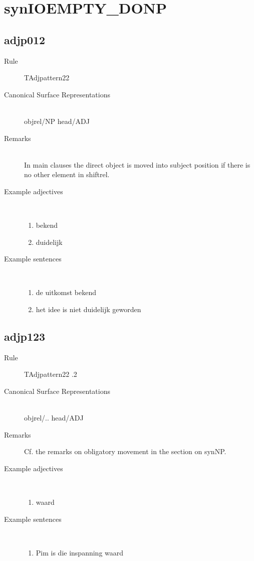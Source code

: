 \section{synIOEMPTY\_DONP}
  \subsection{adjp012}
\begin{description}
  \item [Rule] TAdjpattern22
  \item [Canonical Surface Representations]  \mbox{}\\ objrel/NP head/ADJ
  \item [Remarks] \mbox{}\\
 In main clauses the direct object is moved into subject position if 
there is no other element in shiftrel. 
  \item [Example adjectives]\mbox{}\\
\begin{enumerate}
  \item bekend
  \item duidelijk
\end{enumerate}
  \item [Example sentences]\mbox{}\\
\begin{enumerate}
  \item de uitkomst bekend
  \item het idee  is niet duidelijk geworden
\end{enumerate}
\end{description}
  \subsection{adjp123}
\begin{description}
  \item [Rule] TAdjpattern22 .2
  \item [Canonical Surface Representations]  \mbox{}\\ objrel/.. head/ADJ
  \item [Remarks]
Cf. the remarks on obligatory movement in the section on synNP.
  \item [Example adjectives]\mbox{}\\
\begin{enumerate}
  \item waard
\end{enumerate}
  \item [Example sentences]\mbox{}\\
\begin{enumerate}
  \item Pim is die inspanning waard
\end{enumerate}
\end{description}


